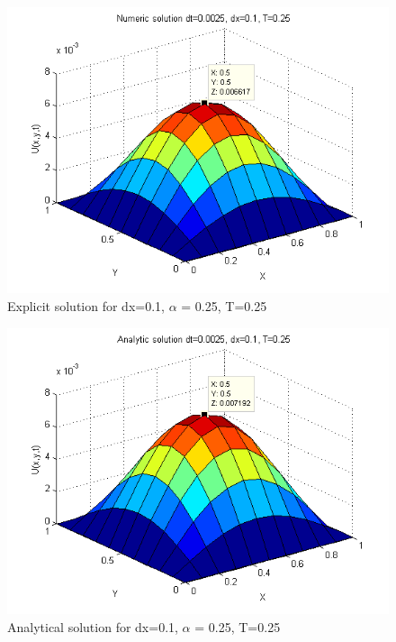 \documentclass[a4paper,10pt]{article}
\begin{document}
\begin{figure}
  \begin{center}
    \includegraphics[scale=0.5]{num_dt00025_dx01_T025}
    \caption{Explicit solution for dx=0.1, $\alpha$ = 0.25, T=0.25}
    \label{fig:Num_dx0.1_dt0.0025T1}
  \end{center}

\end{figure}

\begin{figure}
  \begin{center}
    \includegraphics[scale=0.5]{ana_dt00025_dx01_T025}
    \caption{Analytical solution for dx=0.1, $\alpha$ = 0.25, T=0.25}
    \label{fig:Ana_dx0.1_dt0.0025T1}
  \end{center}
\end{figure}
\end{document}
